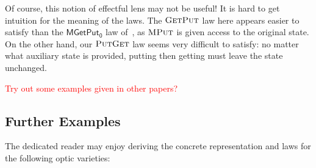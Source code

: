 \documentclass[11pt,letterpaper]{article}
\theoremstyle{plain}
\theoremstyle{definition}
\newcommand{\fget}{\textsc{Get}}
\newcommand{\fput}{\textsc{Put}}
\newcommand{\mput}{\textsc{MPut}}
\newcommand{\todo}[1]{\textcolor{red}{\small #1}}
\begin{document}
Of course, this notion of effectful lens may not be useful! It is hard to get intuition for the meaning of the laws. The $\fget\fput$ law here appears easier to satisfy than the $\mathsf{MGetPut_0}$ law of~\cite{ReflectionsOnMonadicLenses}, as $\mput$ is given access to the original state. On the other hand, our $\fput\fget$ law seems very difficult to satisfy: no matter what auxiliary state is provided, putting then getting must leave the state unchanged.

\todo{Try out some examples given in other papers?}

\subsection{Further Examples}
The dedicated reader may enjoy deriving the concrete representation and laws for the following optic varieties:
\end{document}
